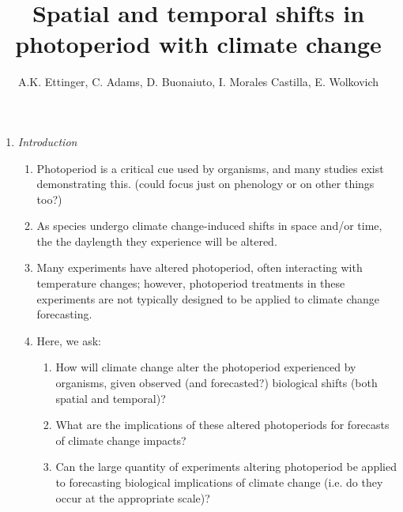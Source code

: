 \documentclass{article}
\begin{document}
 
\title{Spatial and temporal shifts in photoperiod with climate change} %

\author{A.K. Ettinger, C. Adams, D. Buonaiuto, I. Morales Castilla, E. Wolkovich}
\maketitle  %
\begin{enumerate}
\item \textit{Introduction}
\begin{enumerate}
\item Photoperiod is a critical cue used by organisms, and many studies exist demonstrating this. (could focus just on phenology or on other things too?)
\item As species undergo climate change-induced shifts in space and/or time, the the daylength they experience will be altered. 
\item Many experiments have altered photoperiod, often interacting with temperature changes; however, photoperiod treatments in these experiments are not typically designed to be applied to climate change forecasting. 
\item Here, we ask: 
\begin{enumerate}
\item How will climate change alter the photoperiod experienced by organisms, given observed (and forecasted?) biological shifts (both spatial and temporal)?
\item What are the implications of these altered photoperiods for forecasts of climate change impacts?
\item Can the large quantity of experiments altering photoperiod be applied to forecasting biological implications of climate change (i.e. do they occur at the appropriate scale)?
\end{enumerate}
\end{enumerate}


\end{enumerate}
\end{document}
